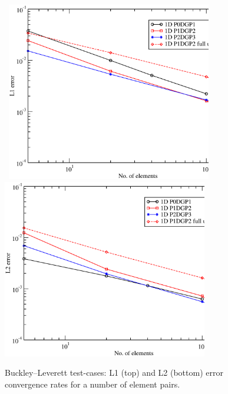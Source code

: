 \begin{figure}[h]
\vbox{\hbox{\hspace{1.cm}
    \includegraphics[width=0.8\textwidth]{diagrams/L1_convergence_rate.eps}}
\vspace{.0cm}\hbox{\hspace{1.cm}
    \includegraphics[width=0.8\textwidth]{diagrams/L2_convergence_rate.eps}}}
    \caption{Buckley--Leverett test-cases: L1 (top) and L2 (bottom) error convergence rates for a number of element pairs. \label{fig:BL_converg-rates}}
\end{figure}

